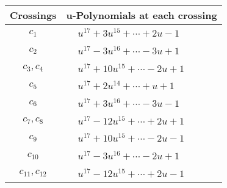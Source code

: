 \documentclass[1p]{elsarticle_modified}
\theoremstyle{definition}
\begin{document}
\begin{tabular}{m{50pt}|m{274pt}}
Crossings & \hspace{64pt}u-Polynomials at each crossing \\
\hline $$\begin{aligned}c_{1}\end{aligned}$$&$\begin{aligned}
&u^{17}+3 u^{15}+\cdots+2 u-1
\end{aligned}$\\
\hline $$\begin{aligned}c_{2}\end{aligned}$$&$\begin{aligned}
&u^{17}-3 u^{16}+\cdots-3 u+1
\end{aligned}$\\
\hline $$\begin{aligned}c_{3},c_{4}\end{aligned}$$&$\begin{aligned}
&u^{17}+10 u^{15}+\cdots-2 u+1
\end{aligned}$\\
\hline $$\begin{aligned}c_{5}\end{aligned}$$&$\begin{aligned}
&u^{17}+2 u^{14}+\cdots+u+1
\end{aligned}$\\
\hline $$\begin{aligned}c_{6}\end{aligned}$$&$\begin{aligned}
&u^{17}+3 u^{16}+\cdots-3 u-1
\end{aligned}$\\
\hline $$\begin{aligned}c_{7},c_{8}\end{aligned}$$&$\begin{aligned}
&u^{17}-12 u^{15}+\cdots+2 u+1
\end{aligned}$\\
\hline $$\begin{aligned}c_{9}\end{aligned}$$&$\begin{aligned}
&u^{17}+10 u^{15}+\cdots-2 u-1
\end{aligned}$\\
\hline $$\begin{aligned}c_{10}\end{aligned}$$&$\begin{aligned}
&u^{17}-3 u^{16}+\cdots-2 u+1
\end{aligned}$\\
\hline $$\begin{aligned}c_{11},c_{12}\end{aligned}$$&$\begin{aligned}
&u^{17}-12 u^{15}+\cdots+2 u-1
\end{aligned}$\\
\hline
\end{tabular}\\~\\
\end{document}
